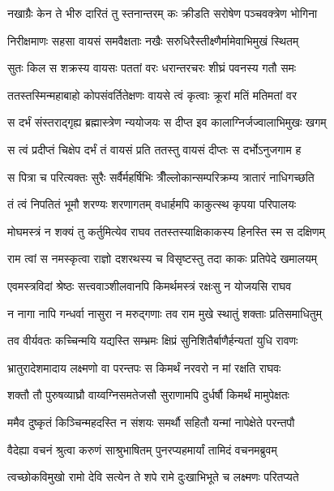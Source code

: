 \twolineshloka
{नखाग्रैः केन ते भीरु दारितं तु स्तनान्तरम्}
{कः क्रीडति सरोषेण पञ्चवक्त्रेण भोगिना} %

\twolineshloka
{निरीक्षमाणः सहसा वायसं समवैक्षताः}
{नखैः सरुधिरैस्तीक्ष्णैर्मामेवाभिमुखं स्थितम्} %

\twolineshloka
{सुतः किल स शक्रस्य वायसः पततां वरः}
{धरान्तरचरः शीघ्रं पवनस्य गतौ समः} %

\twolineshloka
{ततस्तस्मिन्महाबाहो कोपसंवर्तितेक्षणः}
{वायसे त्वं कृत्वाः क्रूरां मतिं मतिमतां वर} %

\twolineshloka
{स दर्भं संस्तराद्गृह्य ब्रह्मास्त्रेण न्ययोजयः}
{स दीप्त इव कालाग्निर्जज्वालाभिमुखः खगम्} %

\twolineshloka
{स त्वं प्रदीप्तं चिक्षेप दर्भं तं वायसं प्रति}
{ततस्तु वायसं दीप्तः स दर्भोऽनुजगाम ह} %

\twolineshloka
{स पित्रा च परित्यक्तः सुरैः सर्वैर्महर्षिभिः}
{त्रीँल्लोकान्सम्परिक्रम्य त्रातारं नाधिगच्छति} %

\twolineshloka
{तं त्वं निपतितं भूमौ शरण्यः शरणागतम्}
{वधार्हमपि काकुत्स्थ कृपया परिपालयः} %

\twolineshloka
{मोघमस्त्रं न शक्यं तु कर्तुमित्येव राघव}
{ततस्तस्याक्षिकाकस्य हिनस्ति स्म स दक्षिणम्} %

\twolineshloka
{राम त्वां स नमस्कृत्वा राज्ञो दशरथस्य च}
{विसृष्टस्तु तदा काकः प्रतिपेदे खमालयम्} %

\twolineshloka
{एवमस्त्रविदां श्रेष्ठः सत्त्ववाञ्शीलवानपि}
{किमर्थमस्त्रं रक्षःसु न योजयसि राघव} %

\twolineshloka
{न नागा नापि गन्धर्वा नासुरा न मरुद्गणाः}
{तव राम मुखे स्थातुं शक्ताः प्रतिसमाधितुम्} %

\twolineshloka
{तव वीर्यवतः कच्चिन्मयि यद्यस्ति सम्भ्रमः}
{क्षिप्रं सुनिशितैर्बाणैर्हन्यतां युधि रावणः} %

\twolineshloka
{भ्रातुरादेशमादाय लक्ष्मणो वा परन्तपः}
{स किमर्थं नरवरो न मां रक्षति राघवः} %

\twolineshloka
{शक्तौ तौ पुरुषव्याघ्रौ वाय्वग्निसमतेजसौ}
{सुराणामपि दुर्धर्षौ किमर्थं मामुपेक्षतः} %

\twolineshloka
{ममैव दुष्कृतं किञ्चिन्महदस्ति न संशयः}
{समर्थौ सहितौ यन्मां नापेक्षेते परन्तपौ} %

\twolineshloka
{वैदेह्या वचनं श्रुत्वा करुणं साश्रुभाषितम्}
{पुनरप्यहमार्यां तामिदं वचनमब्रुवम्} %

\twolineshloka
{त्वच्छोकविमुखो रामो देवि सत्येन ते शपे}
{रामे दुःखाभिभूते च लक्ष्मणः परितप्यते} %

